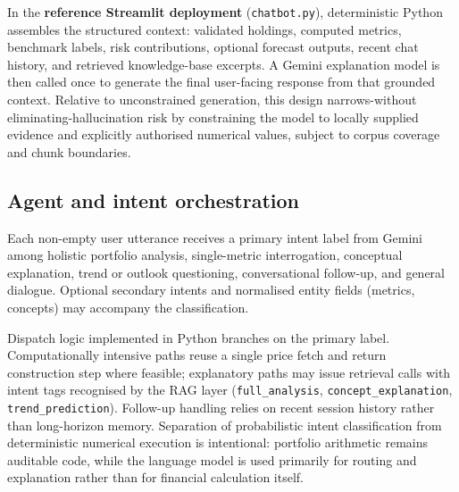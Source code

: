 In the \textbf{reference Streamlit deployment} (\texttt{chatbot.py}), deterministic Python assembles the structured context: validated holdings, computed metrics, benchmark labels, risk contributions, optional forecast outputs, recent chat history, and retrieved knowledge-base excerpts. A Gemini explanation model is then called once to generate the final user-facing response from that grounded context. Relative to unconstrained generation, this design narrows-without eliminating-hallucination risk by constraining the model to locally supplied evidence and explicitly authorised numerical values, subject to corpus coverage and chunk boundaries.

\subsection{Agent and intent orchestration}
Each non-empty user utterance receives a primary intent label from Gemini among holistic portfolio analysis, single-metric interrogation, conceptual explanation, trend or outlook questioning, conversational follow-up, and general dialogue. Optional secondary intents and normalised entity fields (metrics, concepts) may accompany the classification.

Dispatch logic implemented in Python branches on the primary label. Computationally intensive paths reuse a single price fetch and return construction step where feasible; explanatory paths may issue retrieval calls with intent tags recognised by the RAG layer (\texttt{full\_analysis}, \texttt{concept\_explanation}, \texttt{trend\_prediction}). Follow-up handling relies on recent session history rather than long-horizon memory. Separation of probabilistic intent classification from deterministic numerical execution is intentional: portfolio arithmetic remains auditable code, while the language model is used primarily for routing and explanation rather than for financial calculation itself.
